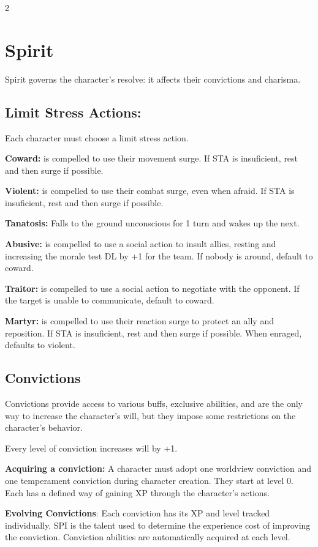 \begin{multicols}{2}
\section{Spirit}

Spirit governs the character's resolve: it affects their convictions and charisma.

\subsection{Limit Stress Actions:}

Each character must choose a limit stress action.

\textbf{Coward:} is compelled to use their movement surge. If STA is insuficient, rest and then surge if possible.

\textbf{Violent:} is compelled to use their combat surge, even when afraid. If STA is insuficient, rest and then surge if possible.

\textbf{Tanatosis:} Falls to the ground unconscious for 1 turn and wakes up the next.

\textbf{Abusive:} is compelled to use a social action to insult allies, resting and increasing the morale test DL by +1 for the team. If nobody is around, default to coward.

\textbf{Traitor:} is compelled to use a social action to negotiate with the opponent. If the target is unable to communicate, default to coward.

\textbf{Martyr:} is compelled to use their reaction surge to protect an ally and reposition. If STA is insuficient, rest and then surge if possible. When enraged, defaults to violent.


\subsection{Convictions}

Convictions provide access to various buffs, exclusive abilities, and are the only way to increase the character's will, but they impose some restrictions on the character's behavior. 

Every level of conviction increases will by +1.

\textbf{Acquiring a conviction:} A character must adopt one worldview conviction and one temperament conviction during character creation. They start at level 0. Each has a defined way of gaining XP through the character's actions.

\textbf{Evolving Convictions}: Each conviction has its XP and level tracked individually. SPI is the talent used to determine the experience cost of improving the conviction. Conviction abilities are automatically acquired at each level.


\end{multicols}

